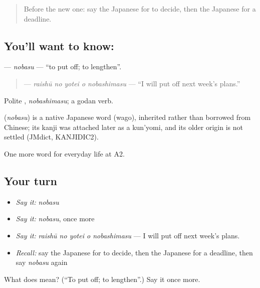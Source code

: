 \label{lesson:JA-C168-nobasu}



\begin{quote}
Before the new one: say the Japanese for to decide, then the Japanese for a deadline.
\end{quote}

\subsection*{You'll want to know: }
\textbf{} — \emph{nobasu} — \textquotedblleft{}to put off; to lengthen\textquotedblright{}.

\begin{quote}
\textbf{  } — \emph{raishū no yotei o nobashimasu} — \textquotedblleft{}I will put off next week's plans.\textquotedblright{}
\end{quote}

Polite \textbf{}, \emph{nobashimasu}; a godan verb.

\begin{cousinweb}
\textbf{} (\emph{nobasu}) is a native Japanese word (wago), inherited rather than borrowed from Chinese; its kanji was attached later as a kun'yomi, and its older origin is not settled (JMdict, KANJIDIC2).
\end{cousinweb}

\begin{grammarlens}[title={What you've built}]
One more word for everyday life at A2.
\end{grammarlens}

\subsection*{Your turn}
\begin{itemize}
\raggedright
  \item \emph{Say it:} \emph{nobasu}
  \item \emph{Say it:} \emph{nobasu}, once more
  \item \emph{Say it:} \emph{raishū no yotei o nobashimasu} — I will put off next week's plans.
  \item \emph{Recall:} say the Japanese for to decide, then the Japanese for a deadline, then say \emph{nobasu} again
\end{itemize}

\begin{tcolorbox}[breakable,colback=teal!4,colframe=teal!35!black,title={Before you move on}]
What does  mean? (\textquotedblleft{}To put off; to lengthen\textquotedblright{}.) Say it once more.
\end{tcolorbox}

